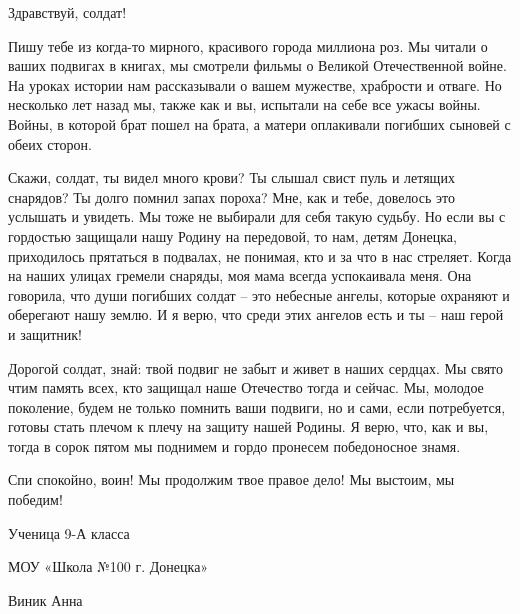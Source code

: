 \begin{zzquote}
Здравствуй, солдат!

Пишу тебе из когда-то мирного, красивого города миллиона роз. Мы читали о ваших
подвигах в книгах, мы смотрели фильмы о Великой Отечественной войне. На уроках
истории нам рассказывали о вашем мужестве, храбрости и отваге. Но несколько лет
назад мы, также как и вы, испытали на себе все ужасы войны. Войны, в которой
брат пошел на брата, а матери оплакивали погибших сыновей с обеих сторон.

Скажи, солдат, ты видел много крови? Ты слышал свист пуль и летящих снарядов?
Ты долго помнил запах пороха? Мне, как и тебе, довелось это услышать и увидеть.
Мы тоже не выбирали для себя такую судьбу. Но если вы с гордостью защищали нашу
Родину на передовой, то нам, детям Донецка, приходилось прятаться в подвалах,
не понимая, кто и за что в нас стреляет. Когда на наших улицах гремели снаряды,
моя мама всегда успокаивала меня. Она говорила, что души погибших солдат – это
небесные ангелы, которые охраняют и оберегают нашу землю. И я верю, что среди
этих ангелов есть и ты – наш герой и защитник!

Дорогой солдат, знай: твой подвиг не забыт и живет в наших сердцах. Мы свято
чтим память всех, кто защищал наше Отечество тогда и сейчас. Мы, молодое
поколение, будем не только помнить ваши подвиги, но и сами, если потребуется,
готовы стать плечом к плечу на защиту нашей Родины. Я верю, что, как и вы,
тогда в сорок пятом мы поднимем и гордо пронесем победоносное знамя.

Спи спокойно, воин! Мы продолжим твое правое дело! Мы выстоим, мы победим!

Ученица 9-А класса

МОУ «Школа №100 г. Донецка»

Виник Анна
\end{zzquote}
